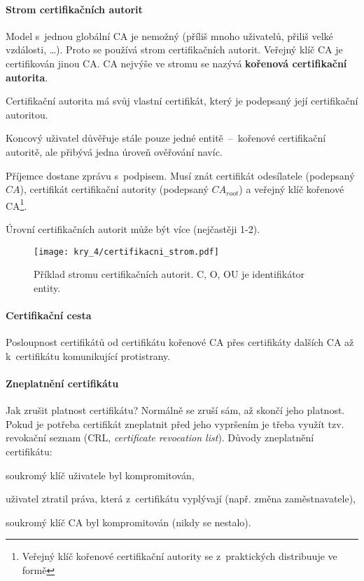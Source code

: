 \paragraph*{Strom certifikačních autorit} Model s~jednou globální CA je nemožný (příliš mnoho uživatelů, přiliš velké vzdálosti, \dots). Proto se používá strom certifikačních autorit. Veřejný klíč CA je certifikován jinou CA. CA nejvýše ve stromu se nazývá \textbf{kořenová certifikační autorita}. \begin{compactitem}
    \item Certifikační autorita má svůj vlastní certifikát, který je podepsaný její certifikační autoritou.
    \item Koncový uživatel důvěřuje stále pouze jedné entitě~--~kořenové certifikační autoritě, ale přibývá jedna úroveň ověřování navíc.
    \item Příjemce dostane zprávu s~podpisem. Musí znát certifikát odesílatele (podepsaný $CA$), certifikát certifikační autority (podepsaný $CA_{root}$) a veřejný klíč kořenové CA\footnote{Veřejný klíč kořenové certifikační autority se z~praktických distribuuje ve formě }.
    \item Úrovní certifikačních autorit může být více (nejčastěji 1-2).
\end{compactitem}

\begin{figure}[H]
    \centering
    \texttt{[image: kry\_4/certifikacni\_strom.pdf]}
    \caption{Příklad stromu certifikačních autorit. C, O, OU je identifikátor entity.}
\end{figure}

\paragraph*{Certifikační cesta} Posloupnost certifikátů od certifikátu kořenové CA přes certifikáty dalších CA až k~certifikátu komunikující protistrany.

\paragraph*{Zneplatnění certifikátu} Jak zrušit platnost certifikátu? Normálně se zruší sám, až skončí jeho platnost. Pokud je potřeba certifikát zneplatnit před jeho vypršením je třeba využít tzv. revokační seznam (CRL, \textit{certificate revocation list}). Důvody zneplatnění certifikátu: \begin{compactitem}
    \item soukromý klíč uživatele byl kompromitován,
    \item uživatel ztratil práva, která z~certifikátu vyplývají (např. změna zaměstnavatele),
    \item soukromý klíč CA byl kompromitován (nikdy se nestalo).
\end{compactitem}

